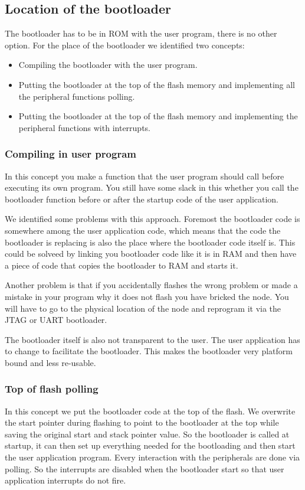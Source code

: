 \documentclass[twocolumn]{article}
\begin{document}
	\subsection*{Location of the bootloader}
		The bootloader has to be in ROM with the user program, there is no other option.
		For the place of the bootloader we identified two concepts:
		\begin{itemize}
			\item Compiling the bootloader with the user program.
			\item Putting the bootloader at the top of the flash memory and implementing all the peripheral functions polling.
			\item Putting the bootloader at the top of the flash memory and implementing the peripheral functions with interrupts.
		\end{itemize}
		
		\subsubsection*{Compiling in user program}
			In this concept you make a function that the user program should call before executing its own program.
			You still have some slack in this whether you call the bootloader function before or after the startup code of the user application.
			
			We identified some problems with this approach.
			Foremost the bootloader code is somewhere among the user application code,
			which means that the code the bootloader is replacing is also the place where the bootloader code itself is.
			This could be solveed by linking you bootloader code like it is in RAM and then have a piece of code that copies the bootloader to RAM and starts it.
			
			Another problem is that if you accidentally flashes the wrong problem or made a mistake in your program why it does not flash you have bricked the node.
			You will have to go to the physical location of the node and reprogram it via the JTAG or UART bootloader.
			
			The bootloader itself is also not transparent to the user.
			The user application has to change to facilitate the bootloader.
			This makes the bootloader very platform bound and less re-usable.
		
		\subsubsection*{Top of flash polling}
			In this concept we put the bootloader code at the top of the flash.
			We overwrite the start pointer during flashing to point to the bootloader at the top while saving the original start and stack pointer value.
			So the bootloader is called at startup,
			it can then set up everything needed for the bootloading and then start the user application program.
			Every interaction with the peripherals are done via polling.
			So the interrupts are disabled when the bootloader start so that user application interrupts do not fire.
			
\end{document}
